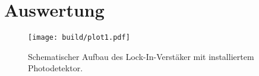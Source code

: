 \section{Auswertung}
\begin{figure}
    \centering
    \texttt{[image: build/plot1.pdf]}
    \caption{Schematischer Aufbau des Lock-In-Verstäker mit installiertem Photodetektor. \cite{skript}} 
    \label{fig:licht}
\end{figure}